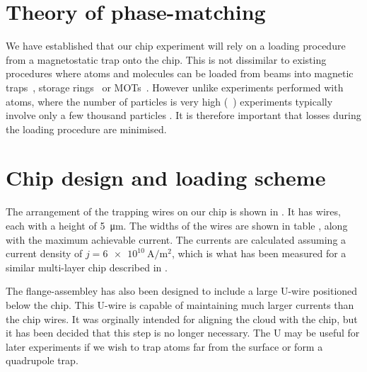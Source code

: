 \section{Theory of phase-matching}

We have established that our chip experiment will rely on a loading procedure
from a magnetostatic trap onto the chip. This is not dissimilar to existing
procedures where atoms and molecules can be loaded from beams into magnetic
traps~\cite{}, storage rings~\cite{} or MOTs~\cite{}. However unlike
experiments performed with atoms, where the number of particles is very high
(~\cite{}) \CaF experiments typically involve only a few thousand
particles \cite{}. It is therefore important that losses during the loading
procedure are minimised.


\section{Chip design and loading scheme}

The arrangement of the trapping wires on our chip is shown in
. It has  wires, each with a height
of \SI{5}{\micro\meter}. The widths of the wires are shown in table
, along with the maximum achievable current. The
currents are calculated assuming a current density of
$j=\SI{6e10}{\ampere\per\meter\squared}$, which is what has been measured for a
similar multi-layer chip described in .

\begin{figure}[h]
\vspace{0.8cm}
\centering
  \caption{}
  \label{design:fig:chip}
\end{figure}

The flange-assembley  has also been designed to include a
large U-wire positioned below the chip. This U-wire is capable of maintaining
much larger currents than the chip wires. It was orginally intended for
aligning the cloud with the chip, but it has been decided that this step is no
longer necessary. The U may be useful for later experiments if we wish to trap
atoms far from the surface or form a quadrupole trap.

